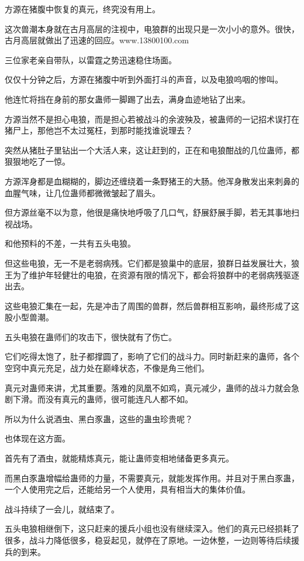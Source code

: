
\begin{this_body}

方源在猪腹中恢复的真元，终究没有用上。

这次兽潮本身就在古月高层的注视中，电狼群的出现只是一次小小的意外。很快，古月高层就做出了迅速的回应。www.13800100.com

三位家老亲自带队，以雷霆之势迅速稳住场面。

仅仅十分钟之后，方源在猪腹中听到外面打斗的声音，以及电狼呜咽的惨叫。

他连忙将挡在身前的那女蛊师一脚踢了出去，满身血迹地钻了出来。

方源当然不是担心电狼，而是担心若被战斗的余波殃及，被蛊师的一记招术误打在猪尸上，那他岂不太过冤枉，到那时能找谁说理去？

突然从猪肚子里钻出一个大活人来，这让赶到的，正在和电狼酣战的几位蛊师，都狠狠地吃了一惊。

方源浑身都是血糊糊的，脚边还缠绕着一条野猪王的大肠。他浑身散发出来刺鼻的血腥气味，让几位蛊师都微微皱起了眉头。

但方源丝毫不以为意，他很是痛快地呼吸了几口气，舒展舒展手脚，若无其事地扫视战场。

和他预料的不差，一共有五头电狼。

但这些电狼，无一不是老弱病残。它们都是狼巢中的底层，狼群日益发展壮大，狼王为了维护年轻健壮的电狼，在资源有限的情况下，都会将狼群中的老弱病残驱逐出去。

这些电狼汇集在一起，先是冲击了周围的兽群，然后兽群相互影响，最终形成了这股小型兽潮。

五头电狼在蛊师们的攻击下，很快就有了伤亡。

它们吃得太饱了，肚子都撑圆了，影响了它们的战斗力。同时新赶来的蛊师，各个空窍中真元充足，战力处在巅峰状态，不像是角三他们。

真元对蛊师来讲，尤其重要。落难的凤凰不如鸡，真元减少，蛊师的战斗力就会急剧下滑。而没有真元的蛊师，很可能连凡人都不如。

所以为什么说酒虫、黑白豕蛊，这些的蛊虫珍贵呢？

也体现在这方面。

首先有了酒虫，就能精炼真元，能让蛊师变相地储备更多真元。

而黑白豕蛊增幅给蛊师的力量，不需要真元，就能发挥作用。并且对于黑白豕蛊，一个人使用完之后，还能给另一个人使用，具有相当大的集体价值。

战斗持续了一会儿，就结束了。

五头电狼相继倒下，这只赶来的援兵小组也没有继续深入。他们的真元已经损耗了很多，战斗力降低很多，稳妥起见，就停在了原地。一边休整，一边则等待后续援兵的到来。


\end{this_body}
